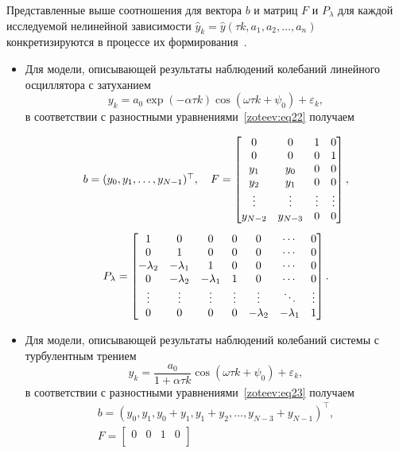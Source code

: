 Представленные выше соотношения для вектора $b$ и матриц $F$ и $P_\lambda$ для каждой исследуемой нелинейной зависимости $\hat{y}_k=\hat{y}(\tau k,a_1,a_2,\dots,a_n)$ конкретизируются в процессе их формирования~\cite{zot:11}.
\begin{itemize}
\item[1.] Для модели, описывающей результаты наблюдений колебаний линейного осциллятора с затуханием 
$$
y_k=a_0\exp(-\alpha\tau k)\cos(\omega\tau k+\psi_0)+\varepsilon_k,
$$ 
в соответствии с разностными уравнениями~\eqref{zoteev:eq22} получаем  

\begin{equation}
\begin{array}{c}
b=(y_0,y_1,\dots,y_{N-1})^{\top}, \quad 
F=\begin{bmatrix}
0 & 0 & 1 & 0 \\
0 & 0 & 0 & 1 \\
y_1 & y_0 & 0 & 0 \\
y_2 & y_1 & 0 & 0 \\
\vdots & \vdots & \vdots & \vdots \\
y_{N-2} & y_{N-3} & 0 & 0 
\end{bmatrix}, \vspace{3mm} \\
P_\lambda=\begin{bmatrix}
1 & 0 & 0 & 0 & 0 & \cdots & 0 \\
0 & 1 & 0 & 0 & 0 & \cdots & 0 \\
-\lambda_2 & -\lambda_1 & 1 & 0 & 0 & \cdots & 0 \\
0 & -\lambda_2 & -\lambda_1 & 1 & 0 &  \cdots & 0 \\
\vdots & \vdots & \vdots & \vdots & \vdots & \ddots & \vdots \\
0 & 0 & 0 &  0 & -\lambda_2 & -\lambda_1 & 1 \\
\end{bmatrix}.
\end{array}
\label{zoteev:eq25}
\end{equation}
\item[2.]
Для модели, описывающей результаты наблюдений колебаний системы с турбулентным трением 
$$
y_k=\dfrac{a_0}{1+\alpha\tau k}\cos(\omega\tau k+\psi_0)+\varepsilon_k,
$$ в соответствии с разностными уравнениями~\eqref{zoteev:eq23} получаем
\begin{gather}
b=(y_0,y_1, y_0+y_1, y_1+y_2, \dots, y_{N-3}+y_{N-1})^{\top},
\\
F=\begin{bmatrix}
0 & 0 & 1 & 0 \\

\end{bmatrix}
\end{gather}
\end{itemize}
